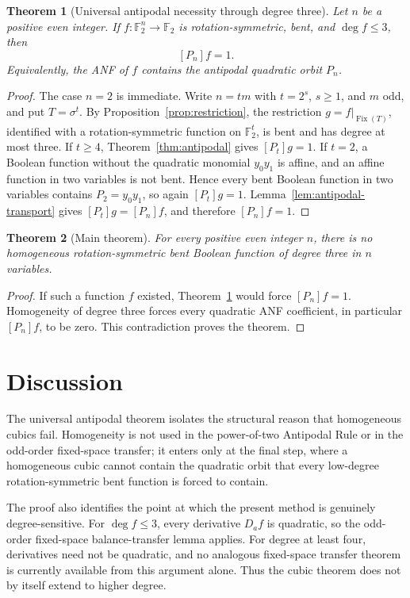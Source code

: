 \documentclass[11pt,a4paper]{article}
\newtheorem{theorem}{Theorem}[section]
\theoremstyle{remark}
\theoremstyle{plain}
\newcommand{\F}{\mathbb F_2}
\newcommand{\Fix}{\operatorname{Fix}}
\begin{document}
\begin{theorem}[Universal antipodal necessity through degree three]\label{thm:universal-antipodal}
Let $n$ be a positive even integer. If $f:\F^n\to\F$ is rotation-symmetric, bent, and $\deg f\le3$, then
\[
[P_n]f=1.
\]
Equivalently, the ANF of $f$ contains the antipodal quadratic orbit $P_n$.
\end{theorem}
\begin{proof}
The case $n=2$ is immediate. Write $n=tm$ with $t=2^s$, $s\ge1$, and $m$ odd, and put $T=\sigma^t$. By Proposition~\ref{prop:restriction}, the restriction $g=f|_{\Fix(T)}$, identified with a rotation-symmetric function on $\F^t$, is bent and has degree at most three. If $t\ge4$, Theorem~\ref{thm:antipodal} gives $[P_t]g=1$. If $t=2$, a Boolean function without the quadratic monomial $y_0y_1$ is affine, and an affine function in two variables is not bent. Hence every bent Boolean function in two variables contains $P_2=y_0y_1$, so again $[P_t]g=1$. Lemma~\ref{lem:antipodal-transport} gives $[P_t]g=[P_n]f$, and therefore $[P_n]f=1$.
\end{proof}

\begin{theorem}[Main theorem]\label{thm:global}
For every positive even integer $n$, there is no homogeneous rotation-symmetric bent Boolean function of degree three in $n$ variables.
\end{theorem}
\begin{proof}
If such a function $f$ existed, Theorem~\ref{thm:universal-antipodal} would force $[P_n]f=1$. Homogeneity of degree three forces every quadratic ANF coefficient, in particular $[P_n]f$, to be zero. This contradiction proves the theorem.
\end{proof}

\section{Discussion}
The universal antipodal theorem isolates the structural reason that homogeneous cubics fail. Homogeneity is not used in the power-of-two Antipodal Rule or in the odd-order fixed-space transfer; it enters only at the final step, where a homogeneous cubic cannot contain the quadratic orbit that every low-degree rotation-symmetric bent function is forced to contain.

The proof also identifies the point at which the present method is genuinely degree-sensitive. For $\deg f\le3$, every derivative $D_af$ is quadratic, so the odd-order fixed-space balance-transfer lemma applies. For degree at least four, derivatives need not be quadratic, and no analogous fixed-space transfer theorem is currently available from this argument alone. Thus the cubic theorem does not by itself extend to higher degree.
\end{document}

